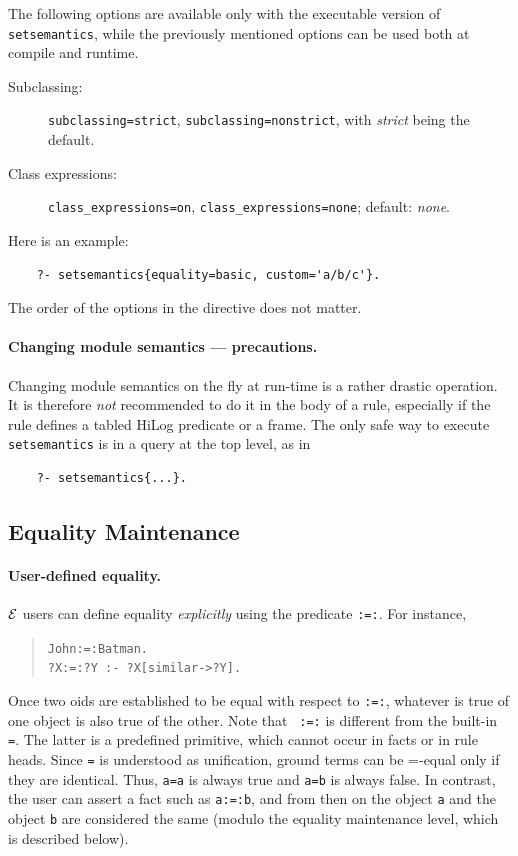 \documentclass[11pt]{article}
\newcommand{\ERGO}{\mbox{\ensuremath{\cal{E}}\smaller{{\sc{RGO}}}}\xspace}
\newcommand{\FLSYSTEM}{\ERGO}
\begin{document}
The following options are available only with the executable version of
\texttt{setsemantics}, while the previously mentioned options can be used both
at compile and runtime.
  \begin{description}
  \item[Subclassing:] \texttt{subclassing=strict},
    \texttt{subclassing=nonstrict}, with \emph{strict} being the default.    
  \item[Class expressions:] \texttt{class\_expressions=on},
    \texttt{class\_expressions=none}; default: \emph{none}.
  \end{description}
Here is an example:
\begin{verbatim}
    ?- setsemantics{equality=basic, custom='a/b/c'}.  
\end{verbatim}
The order of the options in the directive does not matter.

\paragraph{Changing module semantics --- precautions.}
Changing module semantics on the fly at run-time is a rather drastic operation.
It is therefore \emph{not} recommended to do it in the body of a rule,
especially if the rule defines a tabled HiLog predicate or a frame.
The only safe way to execute {\tt setsemantics} is in a query at the top
level, as in
  \begin{verbatim}
    ?- setsemantics{...}.
  \end{verbatim}


\subsection{Equality Maintenance}\label{sec-eqmaintain}


\paragraph{User-defined equality.}
\FLSYSTEM users can define equality \emph{explicitly}
using the predicate {\tt :=:}. For instance,
\begin{quote}
{\tt John:=:Batman.} \\
{\tt ?X:=:?Y :- ?X[similar->?Y].} \\
\end{quote}
Once two oids are established to be equal with respect to {\tt :=:},
whatever is true of one object is also true of the other. Note that {\tt
  :=:} is different from the built-in {\tt =}. The latter is a predefined
primitive, which cannot occur in facts or in rule heads.  
Since {\tt =} is understood as unification, ground terms can be 
  =-equal only if they are identical. Thus, {\tt a=a} is always true and
{\tt a=b} is always false. In contrast, the user can assert a fact such as
{\tt a:=:b}, and from then on the object {\tt a} and the object {\tt b} are
considered the same (modulo the equality maintenance level, which is
described below).       
\end{document}
